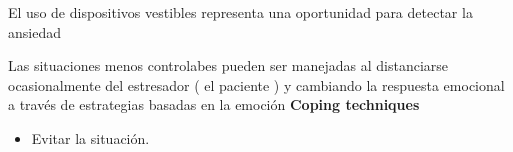\documentclass[letterpaper,12pt]{cicese}
\begin{document}
	El uso de dispositivos vestibles representa una oportunidad para detectar la ansiedad \citep{Miranda:2014:ADU:2676690.2676694}
	
	Las situaciones menos controlabes pueden ser manejadas al distanciarse ocasionalmente del estresador ( el paciente )  y cambiando la respuesta emocional a trav\'es de estrategias basadas en la emoci\'on
	\textbf{Coping techniques}
	\begin{itemize}
		\item Evitar la situaci\'on.
	\end{itemize}
        {\normalsize
		
                
        }


	
\end{document}
